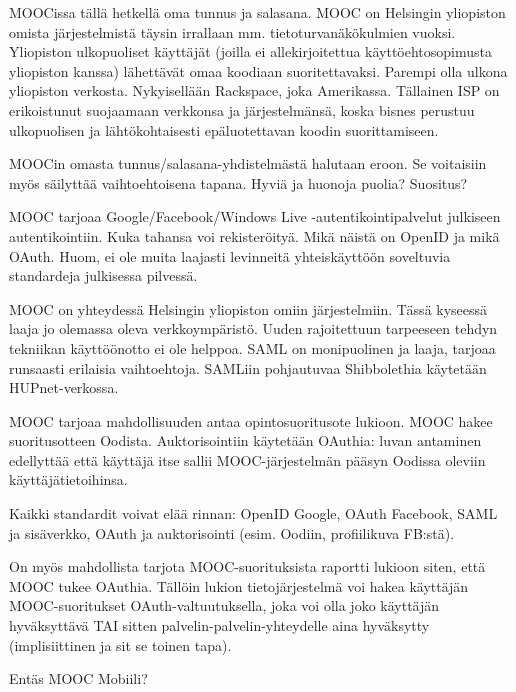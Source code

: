 \documentclass[finnish,gradu]{tktltiki}
\begin{document}
  MOOCissa tällä hetkellä oma tunnus ja salasana. MOOC on Helsingin yliopiston omista järjestelmistä täysin irrallaan mm. tietoturvanäkökulmien vuoksi. Yliopiston ulkopuoliset käyttäjät (joilla ei allekirjoitettua käyttöehtosopimusta yliopiston kanssa) lähettävät omaa koodiaan suoritettavaksi. Parempi olla ulkona yliopiston verkosta. Nykyisellään Rackspace, joka Amerikassa. Tällainen ISP on erikoistunut suojaamaan verkkonsa ja järjestelmänsä, koska bisnes perustuu ulkopuolisen ja lähtökohtaisesti epäluotettavan koodin suorittamiseen.

  MOOCin omasta tunnus/salasana-yhdistelmästä halutaan eroon. Se voitaisiin myös säilyttää vaihtoehtoisena tapana. Hyviä ja huonoja puolia? Suositus?

  MOOC tarjoaa Google/Facebook/Windows Live -autentikointipalvelut julkiseen autentikointiin. Kuka tahansa voi rekisteröityä. Mikä näistä on OpenID ja mikä OAuth. Huom, ei ole muita laajasti levinneitä yhteiskäyttöön soveltuvia standardeja julkisessa pilvessä.

  MOOC on yhteydessä Helsingin yliopiston omiin järjestelmiin. Tässä kyseessä laaja jo olemassa oleva verkkoympäristö. Uuden rajoitettuun tarpeeseen tehdyn tekniikan käyttöönotto ei ole helppoa. SAML on monipuolinen ja laaja, tarjoaa runsaasti erilaisia vaihtoehtoja. SAMLiin pohjautuvaa Shibbolethia käytetään HUPnet-verkossa.

  MOOC tarjoaa mahdollisuuden antaa opintosuoritusote lukioon. MOOC hakee suoritusotteen Oodista. Auktorisointiin käytetään OAuthia: luvan antaminen edellyttää että käyttäjä itse sallii MOOC-järjestelmän pääsyn Oodissa oleviin käyttäjätietoihinsa.

  Kaikki standardit voivat elää rinnan: OpenID Google, OAuth Facebook, SAML ja sisäverkko, OAuth ja auktorisointi (esim. Oodiin, profiilikuva FB:stä).

  On myös mahdollista tarjota MOOC-suorituksista raportti lukioon siten, että MOOC tukee OAuthia. Tällöin lukion tietojärjestelmä voi hakea käyttäjän MOOC-suoritukset OAuth-valtuutuksella, joka voi olla joko käyttäjän hyväksyttävä TAI sitten palvelin-palvelin-yhteydelle aina hyväksytty (implisiittinen ja sit se toinen tapa).


  Entäs MOOC Mobiili? %

\end{document}
